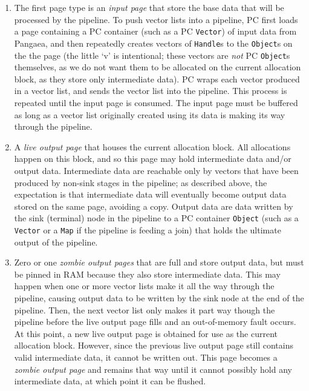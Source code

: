 \begin{enumerate}

\item The first page type is an \emph{input page} that store the base data that will be processed by the pipeline.
To push vector lists into a pipeline, PC first loads a page containing a PC container (such as a PC \texttt{Vector}) of 
input data from Pangaea, and then repeatedly creates vectors of \texttt{Handle}s to the \texttt{Object}s on
the the page (the little `v' is intentional; these vectors are \emph{not} PC \texttt{Object}s themselves, as we do not want them to be allocated
on the current  allocation block, as they store only intermediate data).  PC wraps
each vector produced in a vector list, and sends the vector list into the pipeline.  This process is repeated until the input page is consumed.
The input page must be buffered as long as a vector list originally created using its data is making its way through the pipeline.  

\item A \emph{live output page} that houses the current allocation block.  All allocations happen on this block, and so this page may hold intermediate data
and/or output data.
Intermediate data are 
reachable only by vectors that have been produced
by non-sink stages in the pipeline; as described above, the expectation is that intermediate data will eventually become output data stored on the
same page, avoiding a copy.  Output data are
data written by the sink (terminal) node in the pipeline to a PC container 
\texttt{Object} (such as a \texttt{Vector} or a \texttt{Map} if the pipeline is feeding a join) that holds the ultimate output
of the pipeline.

\item Zero or one \emph{zombie output pages} that are full and store output data, but must
be pinned in RAM because they also store intermediate data.  This may happen when one or more vector lists make it all the way through the pipeline,
causing output data to be written by 
the sink node at the end of the pipeline.  Then, the next vector list only makes it part way though the pipeline before the live
output page
fills and an out-of-memory fault occurs.  
At this point, a new live output page is obtained for use
as the current allocation block.  However, since the previous live output page still contains valid intermediate data, it cannot be written out.  This 
page becomes a \emph{zombie output page} and remains that way until it cannot possibly hold any intermediate data, at which point it can be flushed.


\end{enumerate}
